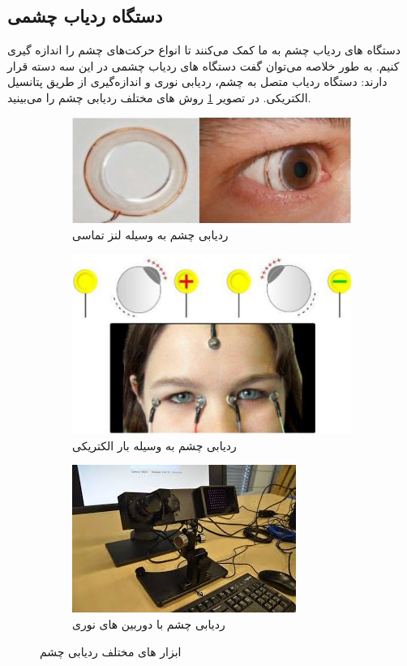 \subsection{دستگاه ردیاب چشمی}
دستگاه های ردیاب چشم به ما کمک می‌کنند تا انواع حرکت‌های چشم را اندازه گیری کنیم.
به طور خلاصه می‌توان گفت دستگاه های ردیاب چشمی در این سه دسته قرار دارند: دستگاه ردیاب متصل به چشم، ردیابی نوری و اندازه‌گیری از طریق پتانسیل الکتریکی. در تصویر
\ref{fig:eyetech}
روش های مختلف ردیابی چشم را می‌بینید.

\begin{figure}[htbp]
	\centering
	
	\begin{subfigure}{.8\textwidth}
		\centering
		\includegraphics[width=0.7\linewidth]{figures/contact_lens}
		\caption{ردیابی چشم به وسیله لنز تماسی}
	\end{subfigure}
	\newline
	\begin{subfigure}{.8\textwidth}
		\centering
		\includegraphics[width=0.7\linewidth]{figures/EOG}
		\caption{ردیابی چشم به وسیله بار الکتریکی}
	\end{subfigure}	
	\newline
	\begin{subfigure}{.8\textwidth}
		\centering
		\includegraphics[width=0.7\linewidth]{figures/optical}
		\caption{ردیابی چشم با دوربین های نوری}
	\end{subfigure}

	\caption[ابزار های مختلف ردیابی چشم]{ابزار های مختلف ردیابی چشم}
	\label{fig:eyetech}
\end{figure}



